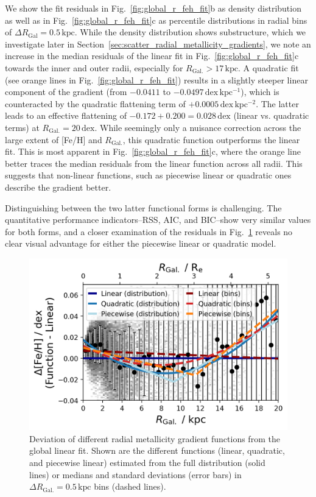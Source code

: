\documentclass[fleqn,usenatbib]{mnras}
\begin{document}
We show the fit residuals in Fig.~\ref{fig:global_r_feh_fit}b as density distribution as well as in Fig.~\ref{fig:global_r_feh_fit}c as percentile distributions in radial bins of $\Delta R_\mathrm{Gal} = 0.5\,\mathrm{kpc}$. While the density distribution shows substructure, which we investigate later in Section~\ref{sec:scatter_radial_metallicity_gradients}, we note an increase in the median residuals of the linear fit in Fig.~\ref{fig:global_r_feh_fit}c towards the inner and outer radii, especially for $R_\mathrm{Gal.} > 17\,\mathrm{kpc}$. A quadratic fit (see orange lines in Fig.~\ref{fig:global_r_feh_fit}) results in a slightly steeper linear component of the gradient (from $-0.0411$ to $-0.0497\,\mathrm{dex\,kpc^{-1}}$), which is counteracted by the quadratic flattening term of $+0.0005\,\mathrm{dex\,kpc^{-2}}$. The latter leads to an effective flattening of $-0.172 + 0.200 = 0.028\,\mathrm{dex}$ (linear vs. quadratic terms) at $R_\mathrm{Gal.} = 20\,\mathrm{dex}$. While seemingly only a nuisance correction across the large extent of [Fe/H] and $R_\mathrm{Gal.}$, this quadratic function outperforms the linear fit. This is most apparent in Fig.~\ref{fig:global_r_feh_fit}c, where the orange line better traces the median residuals from the linear function across all radii. This suggests that non-linear functions, such as piecewise linear or quadratic ones describe the gradient better.

Distinguishing between the two latter functional forms is challenging. The quantitative performance indicators--RSS, AIC, and BIC--show very similar values for both forms, and a closer examination of the residuals in Fig.~\ref{fig:linear_quadratic_piecewise} reveals no clear visual advantage for either the piecewise linear or quadratic model.

\begin{figure}
    \centering
    \includegraphics[width=\columnwidth]{figures/linear_quadratic_piecewise.png}
    \caption{Deviation of different radial metallicity gradient functions from the global linear fit. Shown are the different functions (linear, quadratic, and piecewise linear) estimated from the full distribution (solid lines) or medians and standard deviations (error bars) in $\Delta R_\mathrm{Gal.} = 0.5\,\mathrm{kpc}$ bins (dashed lines).}
    \label{fig:linear_quadratic_piecewise}
\end{figure}
\end{document}
